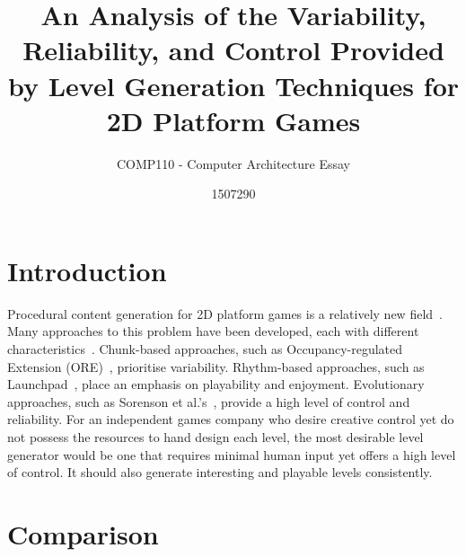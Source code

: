 \documentclass{scrartcl}
\title{An Analysis of the Variability, Reliability, and Control Provided by Level Generation Techniques for 2D Platform Games}
\subtitle{COMP110 - Computer Architecture Essay}
\author{1507290}
\begin{document}
\maketitle


\section{Introduction}
Procedural content generation for 2D platform games is a relatively new field~\cite{compton:platform}. Many approaches to this problem have been developed, each with different characteristics~\cite{horn:comparative}. Chunk-based approaches, such as Occupancy-regulated Extension (ORE)~\cite{mawhorter:occupancy}, prioritise variability. Rhythm-based approaches, such as Launchpad~\cite{smith:launchpad}, place an emphasis on playability and enjoyment. Evolutionary approaches, such as Sorenson et al.'s~\cite{sorenson:generic}, provide a high level of control and reliability. For an independent games company who desire creative control yet do not possess the resources to hand design each level, the most desirable level generator would be one that requires minimal human input yet offers a high level of control. It should also generate interesting and playable levels consistently. 



\section{Comparison}
\end{document}
